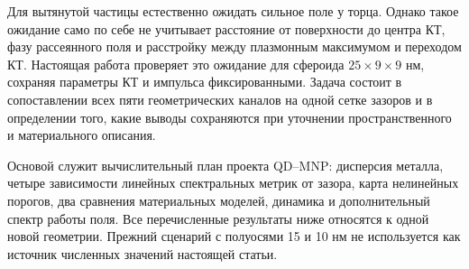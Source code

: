 \documentclass[12pt,a4paper]{article}
\begin{document}
Для вытянутой частицы естественно ожидать сильное поле у торца.
Однако такое ожидание само по себе не учитывает расстояние от поверхности
до центра КТ, фазу рассеянного поля и расстройку между плазмонным
максимумом и переходом КТ. Настоящая работа проверяет это ожидание для
сфероида $25\times9\times9$ нм, сохраняя параметры КТ и импульса
фиксированными. Задача состоит в сопоставлении всех пяти геометрических
каналов на одной сетке зазоров и в определении того, какие выводы
сохраняются при уточнении пространственного и материального описания.

Основой служит вычислительный план проекта QD--MNP: дисперсия металла,
четыре зависимости линейных спектральных метрик от зазора, карта
нелинейных порогов, два сравнения материальных моделей, динамика и
дополнительный спектр работы поля. Все перечисленные результаты ниже
относятся к одной новой геометрии. Прежний сценарий с полуосями 15 и
10 нм не используется как источник численных значений настоящей статьи.






\clearpage
\appendix

\end{document}

